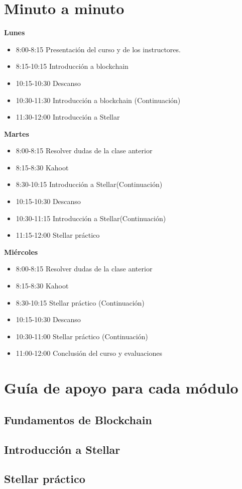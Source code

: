 \documentclass[a4paper,12pt]{/home/armando/Documentos/Cursos/LaTeX/Plantillas/lib/pub}
\begin{document}
\section{Minuto a minuto}
\textbf{Lunes}
\begin{itemize}
	\item 8:00-8:15 Presentación del curso y de los instructores.
	\item 8:15-10:15 Introducción a blockchain
	\item 10:15-10:30 Descanso
	\item 10:30-11:30 Introducción a blockchain (Continuación)
	\item 11:30-12:00 Introducción a Stellar
\end{itemize}
\textbf{Martes}
\begin{itemize}
	\item 8:00-8:15 Resolver dudas de la clase anterior
	\item 8:15-8:30 Kahoot
	\item 8:30-10:15 Introducción a Stellar(Continuación)
	\item 10:15-10:30 Descanso
	\item 10:30-11:15 Introducción a Stellar(Continuación)
	\item 11:15-12:00 Stellar práctico
\end{itemize}
\textbf{Miércoles}
\begin{itemize}
	\item 8:00-8:15 Resolver dudas de la clase anterior
	\item 8:15-8:30 Kahoot
	\item 8:30-10:15 Stellar práctico (Continuación)
	\item 10:15-10:30 Descanso
	\item 10:30-11:00 Stellar práctico (Continuación)
	\item 11:00-12:00 Conclusión del curso y evaluaciones
\end{itemize}
\section{Guía de apoyo para cada módulo}
	\subsection{Fundamentos de Blockchain}
	\subsection{Introducción a Stellar}
	\subsection{Stellar práctico}
	
\end{document}
